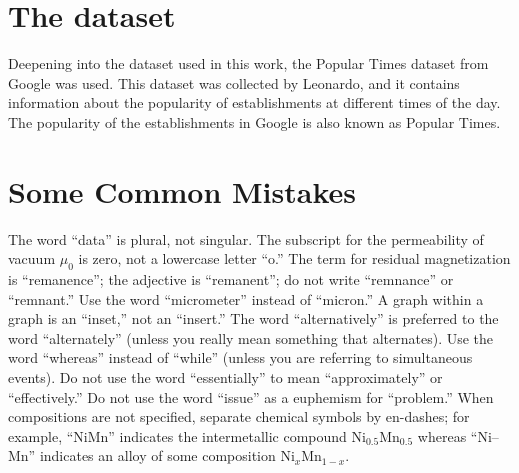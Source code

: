 \documentclass{ieeeaccess}
\begin{document}


\section{The dataset} %
Deepening into the dataset used in this work, the Popular Times dataset from Google was used. This dataset was collected by Leonardo, and it contains information about the popularity of establishments at different times of the day. The popularity of the establishments in Google is also known as Popular Times.

\section{Some Common Mistakes}
The word ``data'' is plural, not singular. The subscript for the
permeability of vacuum $\mu _{0}$ is zero, not a lowercase letter
``o.'' The term for residual magnetization is ``remanence''; the adjective
is ``remanent''; do not write ``remnance'' or ``remnant.'' Use the word
``micrometer'' instead of ``micron.'' A graph within a graph is an
``inset,'' not an ``insert.'' The word ``alternatively'' is preferred to the
word ``alternately'' (unless you really mean something that alternates). Use
the word ``whereas'' instead of ``while'' (unless you are referring to
simultaneous events). Do not use the word ``essentially'' to mean
``approximately'' or ``effectively.'' Do not use the word ``issue'' as a
euphemism for ``problem.'' When compositions are not specified, separate
chemical symbols by en-dashes; for example, ``NiMn'' indicates the
intermetallic compound Ni$_{0.5}$Mn$_{0.5}$ whereas
``Ni--Mn'' indicates an alloy of some composition
Ni$_{x}$Mn$_{1-x}$.
\end{document}
